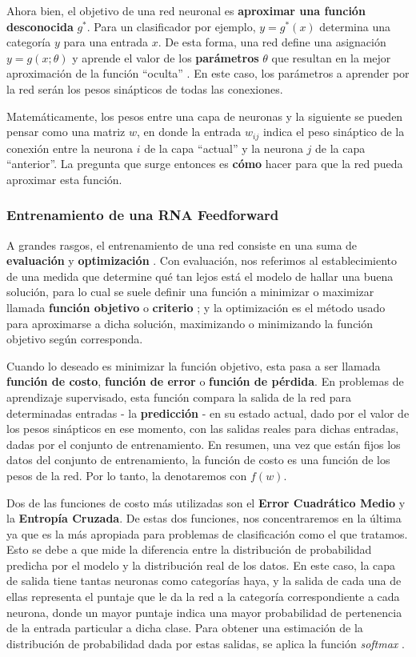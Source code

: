 \documentclass[../../main.tex]{subfiles}
\begin{document}
Ahora bien, el objetivo de una red neuronal es \textbf{aproximar una función desconocida} \(g^*\). Para un clasificador por ejemplo, \(y=g^*(x)\) determina una categoría \(y\) para una entrada \(x\). De esta forma, una red define una asignación \(y=g(x; \theta)\) y aprende el valor de los \textbf{parámetros} \(\theta\) que resultan en la mejor aproximación de la función ``oculta'' \cite{deep-learning}. En este caso, los parámetros a aprender por la red serán los pesos sinápticos de todas las conexiones.

Matemáticamente, los pesos entre una capa de neuronas y la siguiente se pueden pensar como una matriz \(w\), en donde la entrada \(w_{ij}\) indica el peso sináptico de la conexión entre la neurona \(i\) de la capa ``actual'' y la neurona \(j\) de la capa ``anterior''. La pregunta que surge entonces es \textbf{cómo} hacer para que la red pueda aproximar esta función.

\subsubsection{Entrenamiento de una RNA Feedforward}
A grandes rasgos, el entrenamiento de una red consiste en una suma de \textbf{evaluación} y \textbf{optimización} \cite{pedro-domingos}. Con evaluación, nos referimos al establecimiento de una medida que determine qué tan lejos está el modelo de hallar una buena solución, para lo cual se suele definir una función a minimizar o maximizar llamada \textbf{función objetivo} o \textbf{criterio} \cite{deep-learning}; y la optimización es el método usado para aproximarse a dicha solución, maximizando o minimizando la función objetivo según corresponda.

Cuando lo deseado es minimizar la función objetivo, esta pasa a ser llamada \textbf{función de costo}, \textbf{función de error} o \textbf{función de pérdida}. En problemas de aprendizaje supervisado, esta función compara la salida de la red para determinadas entradas - la \textbf{predicción} - en su estado actual, dado por el valor de los pesos sinápticos en ese momento, con las salidas reales para dichas entradas, dadas por el conjunto de entrenamiento. En resumen, una vez que están fijos los datos del conjunto de entrenamiento, la función de costo es una función de los pesos de la red. Por lo tanto, la denotaremos con \(f(w)\).

Dos de las funciones de costo más utilizadas son el \textbf{Error Cuadrático Medio} y la \textbf{Entropía Cruzada}. De estas dos funciones, nos concentraremos en la última ya que es la más apropiada para problemas de clasificación como el que tratamos. Esto se debe a que mide la diferencia entre la distribución de probabilidad predicha por el modelo y la distribución real de los datos.  En este caso, la capa de salida tiene tantas neuronas como categorías haya, y la salida de cada una de ellas representa el puntaje que le da la red a la categoría correspondiente a cada neurona, donde un mayor puntaje indica una mayor probabilidad de pertenencia de la entrada particular a dicha clase. Para obtener una estimación de la distribución de probabilidad dada por estas salidas, se aplica la función \textit{softmax} \cite{hands-on-ML-sklearn-tf}.
\end{document}
